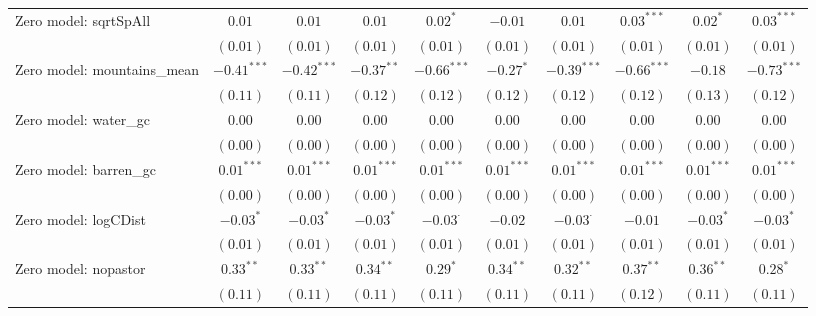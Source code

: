 \begin{center}
\begin{longtable}{l c c c c c c c c c}
Zero model: sqrtSpAll          & $0.01$        & $0.01$        & $0.01$        & $0.02^{*}$      & $-0.01$       & $0.01$          & $0.03^{***}$    & $0.02^{*}$    & $0.03^{***}$  \\
                               & $(0.01)$      & $(0.01)$      & $(0.01)$      & $(0.01)$        & $(0.01)$      & $(0.01)$        & $(0.01)$        & $(0.01)$      & $(0.01)$      \\
Zero model: mountains\_mean    & $-0.41^{***}$ & $-0.42^{***}$ & $-0.37^{**}$  & $-0.66^{***}$   & $-0.27^{*}$   & $-0.39^{***}$   & $-0.66^{***}$   & $-0.18$       & $-0.73^{***}$ \\
                               & $(0.11)$      & $(0.11)$      & $(0.12)$      & $(0.12)$        & $(0.12)$      & $(0.12)$        & $(0.12)$        & $(0.13)$      & $(0.12)$      \\
Zero model: water\_gc          & $0.00$        & $0.00$        & $0.00$        & $0.00$          & $0.00$        & $0.00$          & $0.00$          & $0.00$        & $0.00$        \\
                               & $(0.00)$      & $(0.00)$      & $(0.00)$      & $(0.00)$        & $(0.00)$      & $(0.00)$        & $(0.00)$        & $(0.00)$      & $(0.00)$      \\
Zero model: barren\_gc         & $0.01^{***}$  & $0.01^{***}$  & $0.01^{***}$  & $0.01^{***}$    & $0.01^{***}$  & $0.01^{***}$    & $0.01^{***}$    & $0.01^{***}$  & $0.01^{***}$  \\
                               & $(0.00)$      & $(0.00)$      & $(0.00)$      & $(0.00)$        & $(0.00)$      & $(0.00)$        & $(0.00)$        & $(0.00)$      & $(0.00)$      \\
Zero model: logCDist           & $-0.03^{*}$   & $-0.03^{*}$   & $-0.03^{*}$   & $-0.03^{\cdot}$ & $-0.02$       & $-0.03^{\cdot}$ & $-0.01$         & $-0.03^{*}$   & $-0.03^{*}$   \\
                               & $(0.01)$      & $(0.01)$      & $(0.01)$      & $(0.01)$        & $(0.01)$      & $(0.01)$        & $(0.01)$        & $(0.01)$      & $(0.01)$      \\
Zero model: nopastor           & $0.33^{**}$   & $0.33^{**}$   & $0.34^{**}$   & $0.29^{*}$      & $0.34^{**}$   & $0.32^{**}$     & $0.37^{**}$     & $0.36^{**}$   & $0.28^{*}$    \\
                               & $(0.11)$      & $(0.11)$      & $(0.11)$      & $(0.11)$        & $(0.11)$      & $(0.11)$        & $(0.12)$        & $(0.11)$      & $(0.11)$      \\

\end{longtable}
\end{center}
